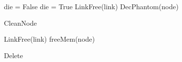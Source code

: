 \begin{algorithm}[H]
	\scriptsize
	
	\begin{multicols}{2}
		\begin{algorithmic}[1]
{}
\State die = False
\State die = True
\EndIf
{}
\State LinkFree(link)
\EndFor
\EndIf
\State DecPhantom(node)
\EndProcedure
\caption{CleanNode}
\label{algorithm:cleanup}
\end{algorithmic}
\end{multicols}
\end{algorithm}
\setlength{\textfloatsep}{0pt}


\begin{algorithm}[H]
	\scriptsize
	
	\begin{multicols}{2}
		\begin{algorithmic}[1]
{}
{}
\State LinkFree(link)
\EndFor
\State freeMem(node)

 \EndProcedure 
\caption{Delete}
\label{algorithm:Delete}
\end{algorithmic}
\end{multicols}
\end{algorithm}
\setlength{\textfloatsep}{0pt}


